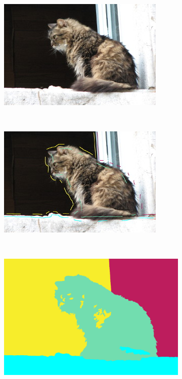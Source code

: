 \begin{figure}[htb]
 \centering
 \begin{subfigure}{0.4\textwidth}	
\includegraphics[width=\textwidth]{images/evaluation/004.jpg}
 \end{subfigure}
 \\
 \begin{subfigure}{0.4\textwidth}	
\includegraphics[width=\textwidth]{images/evaluation/004_seeds1.jpg}
 \end{subfigure}
 ~
 \begin{subfigure}{0.4\textwidth}	
\includegraphics[width=\textwidth]{images/evaluation/004_res1.jpg}

\end{subfigure}
\end{figure}
